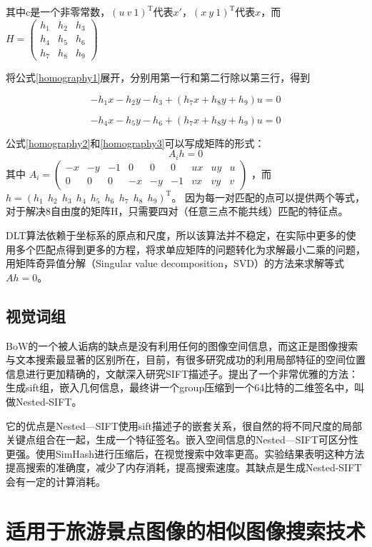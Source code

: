 其中c是一个非零常数，\((u\ v\ 1)^\mathrm{T}\)代表\(x'\)，\((x \ y \ 1)^\mathrm{T}\)代表\(x\)，而
\(
H = 
\begin{pmatrix}
h_1 & h_2 & h_3 \\
h_4 & h_5 & h_6 \\
h_7 & h_8 & h_9
\end{pmatrix}
\)

将公式\eqref{homography1}展开，分别用第一行和第二行除以第三行，得到

\begin{equation}
\label{homography2}
-h_1x - h_2y - h_3 + (h_7x+h_8y+h_9)u = 0
\end{equation}

\begin{equation}
\label{homography3}
-h_4x - h_5y - h_6 + (h_7x+h_8y+h_9)u = 0
\end{equation}

公式\eqref{homography2}和\eqref{homography3}可以写成矩阵的形式：
\begin{equation}
\label{homography4}
A_ih = 0
\end{equation}
其中
\(
A_i = 
\begin{pmatrix}
-x & -y & -1 & 0 & 0 & 0 &ux & uy & u \\
0 & 0 & 0 & -x & -y & -1 &vx & vy & v 
\end{pmatrix}
\)
，而
\(
h = (h_1 \ \ h_2 \ \ h_3 \ \ h_4 \ \ h_5 \ \ h_6 \ \ h_7 \ \ h_8 \ \ h_9)^\mathrm{T}
\)。
因为每一对匹配的点可以提供两个等式，对于解决8自由度的矩阵H，只需要四对（任意三点不能共线）匹配的特征点。

DLT算法依赖于坐标系的原点和尺度，所以该算法并不稳定，在实际中更多的使用多个匹配点得到更多的方程，将求单应矩阵的问题转化为求解最小二乘的问题，用矩阵奇异值分解（Singular value decomposition，SVD）的方法来求解等式\(Ah = 0\)。

\subsection{视觉词组}

BoW的一个被人诟病的缺点是没有利用任何的图像空间信息，而这正是图像搜索与文本搜索最显著的区别所在，目前，有很多研究成功的利用局部特征的空间位置信息进行更加精确的，文献\cite{Xu:2013wc}深入研究SIFT描述子。提出了一个非常优雅的方法：生成sift组，嵌入几何信息，最终讲一个group压缩到一个64比特的二维签名中，叫做Nested-SIFT。

它的优点是Nested—SIFT使用sift描述子的嵌套关系，很自然的将不同尺度的局部关键点组合在一起，生成一个特征签名。嵌入空间信息的Nested—SIFT可区分性更强。使用SimHash进行压缩后，在视觉搜索中效率更高。实验结果表明这种方法提高搜索的准确度，减少了内存消耗，提高搜索速度。其缺点是生成Nested-SIFT会有一定的计算消耗。

\section{适用于旅游景点图像的相似图像搜索技术}

\ifx\usechapbib\empty
\nocite{BSTcontrol}


\fi
